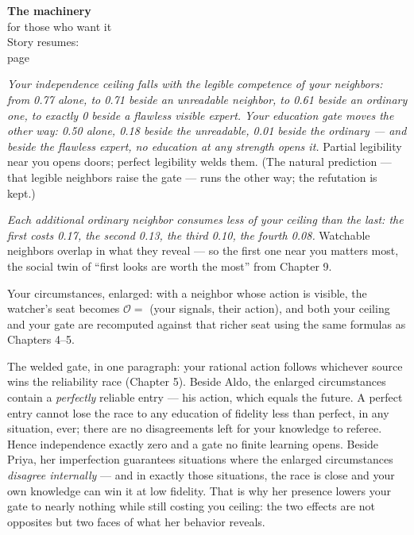 \begin{machinery}{\textbf{The machinery}\\for those who want it\\[3pt]{\color{muted}Story resumes:\\page~\pageref{ch11}}}



\label{claim-18}

\noindent \emph{Your
independence ceiling falls with the legible competence of your
neighbors: from 0.77 alone, to 0.71 beside an unreadable neighbor, to
0.61 beside an ordinary one, to exactly 0 beside a flawless visible
expert. Your education gate moves the other way: 0.50 alone, 0.18
beside the unreadable, 0.01 beside the ordinary --- and beside the
flawless expert, no education at any strength opens it.} Partial
legibility near you opens doors; perfect legibility welds them.
(The natural prediction --- that legible neighbors raise the gate --- runs
the other way; the refutation is kept.)


\label{claim-19}

\noindent \emph{Each additional
ordinary neighbor consumes less of your ceiling than the last: the
first costs 0.17, the second 0.13, the third 0.10, the fourth 0.08.}
Watchable neighbors overlap in what they reveal --- so the first one
near you matters most, the social twin of ``first looks are worth the
most'' from Chapter 9.


Your circumstances, enlarged: with a neighbor whose action is visible,
the watcher's seat becomes \(\mathcal{O} =\) (your signals, their action), and both
your ceiling and your gate are recomputed against that richer seat
using the same formulas as Chapters 4--5.


The welded gate, in one paragraph: your rational action follows
whichever source wins the reliability race (Chapter 5). Beside Aldo,
the enlarged circumstances contain a \emph{perfectly} reliable entry --- his
action, which equals the future. A perfect entry cannot lose the race
to any education of fidelity less than perfect, in any situation, ever;
there are no disagreements left for your knowledge to referee. Hence
independence exactly zero and a gate no finite learning opens. Beside
Priya, her imperfection guarantees situations where the enlarged
circumstances \emph{disagree internally} --- and in exactly those situations,
the race is close and your own knowledge can win it at low fidelity.
That is why her presence lowers your gate to nearly nothing while
still costing you ceiling: the two effects are not opposites but two
faces of what her behavior reveals.


\end{machinery}
